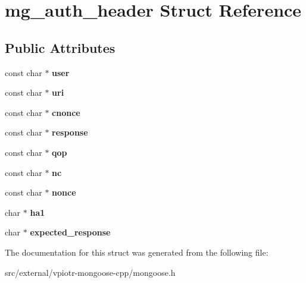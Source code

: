 \hypertarget{structmg__auth__header}{\section{mg\-\_\-auth\-\_\-header Struct Reference}
\label{structmg__auth__header}
}
\subsection*{Public Attributes}
\begin{DoxyCompactItemize}
\item 
\hypertarget{structmg__auth__header_a8c319ac11aa126fcac89a44c46739d14}{const char $\ast$ {\bfseries user}}\label{structmg__auth__header_a8c319ac11aa126fcac89a44c46739d14}

\item 
\hypertarget{structmg__auth__header_a3504ba32c6a43a3fc4a0441ed95786e8}{const char $\ast$ {\bfseries uri}}\label{structmg__auth__header_a3504ba32c6a43a3fc4a0441ed95786e8}

\item 
\hypertarget{structmg__auth__header_a9d5bd4d95827a71bb36a8a7e98cbc1fe}{const char $\ast$ {\bfseries cnonce}}\label{structmg__auth__header_a9d5bd4d95827a71bb36a8a7e98cbc1fe}

\item 
\hypertarget{structmg__auth__header_a4dd86377fe54a6879d2ffa294533a26a}{const char $\ast$ {\bfseries response}}\label{structmg__auth__header_a4dd86377fe54a6879d2ffa294533a26a}

\item 
\hypertarget{structmg__auth__header_a71c2332a5fccd8eb243981f8019be8fd}{const char $\ast$ {\bfseries qop}}\label{structmg__auth__header_a71c2332a5fccd8eb243981f8019be8fd}

\item 
\hypertarget{structmg__auth__header_ab407074f03b164f58d17b1173f55fda9}{const char $\ast$ {\bfseries nc}}\label{structmg__auth__header_ab407074f03b164f58d17b1173f55fda9}

\item 
\hypertarget{structmg__auth__header_a5bcf28b3228c92d5be142ef63b71cd08}{const char $\ast$ {\bfseries nonce}}\label{structmg__auth__header_a5bcf28b3228c92d5be142ef63b71cd08}

\item 
\hypertarget{structmg__auth__header_ab10d3753d1fe38c7bbf48dafbb0a6455}{char $\ast$ {\bfseries ha1}}\label{structmg__auth__header_ab10d3753d1fe38c7bbf48dafbb0a6455}

\item 
\hypertarget{structmg__auth__header_a45f4edc88b7b6d55a9d5a49110a1f9f7}{char $\ast$ {\bfseries expected\-\_\-response}}\label{structmg__auth__header_a45f4edc88b7b6d55a9d5a49110a1f9f7}

\end{DoxyCompactItemize}


The documentation for this struct was generated from the following file\-:\begin{DoxyCompactItemize}
\item 
src/external/vpiotr-\/mongoose-\/cpp/mongoose.\-h\end{DoxyCompactItemize}
